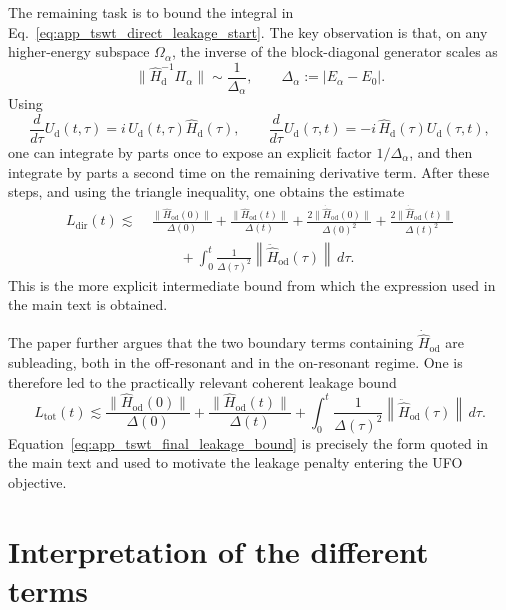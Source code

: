The remaining task is to bound the integral in Eq.~\eqref{eq:app_tswt_direct_leakage_start}. The key observation is that, on any higher-energy subspace \(\Omega_\alpha\), the inverse of the block-diagonal generator scales as
\begin{equation}
\|\hat{H}_{\mathrm d}^{-1}\Pi_\alpha\|
\sim
\frac{1}{\Delta_\alpha},
\qquad
\Delta_\alpha:=|E_\alpha-E_0|.
\label{eq:app_tswt_inverse_gap_scaling}
\end{equation}
Using
\begin{equation}
\frac{d}{d\tau}U_{\mathrm d}(t,\tau)
=
i\,U_{\mathrm d}(t,\tau)\hat{H}_{\mathrm d}(\tau),
\qquad
\frac{d}{d\tau}U_{\mathrm d}(\tau,t)
=
-i\,\hat{H}_{\mathrm d}(\tau)U_{\mathrm d}(\tau,t),
\label{eq:app_tswt_Ud_derivatives}
\end{equation}
one can integrate by parts once to expose an explicit factor \(1/\Delta_\alpha\), and then integrate by parts a second time on the remaining derivative term. After these steps, and using the triangle inequality, one obtains the estimate
\begin{align}
L_{\mathrm{dir}}(t)
\lesssim\;&
\frac{\|\hat{H}_{\mathrm{od}}(0)\|}{\Delta(0)}
+
\frac{\|\hat{H}_{\mathrm{od}}(t)\|}{\Delta(t)}
+
\frac{2\|\dot{\hat{H}}_{\mathrm{od}}(0)\|}{\Delta(0)^2}
+
\frac{2\|\dot{\hat{H}}_{\mathrm{od}}(t)\|}{\Delta(t)^2}
\nonumber\\
&\qquad
+
\int_0^t
\frac{1}{\Delta(\tau)^2}
\left\|
\ddot{\hat{H}}_{\mathrm{od}}(\tau)
\right\|
\,d\tau .
\label{eq:app_tswt_preliminary_leakage_bound}
\end{align}
This is the more explicit intermediate bound from which the expression used in the main text is obtained.

The paper further argues that the two boundary terms containing \(\dot{\hat H}_{\mathrm{od}}\) are subleading, both in the off-resonant and in the on-resonant regime. One is therefore led to the practically relevant coherent leakage bound
\begin{equation}
L_{\mathrm{tot}}(t)
\lesssim
\frac{\|\hat{H}_{\mathrm{od}}(0)\|}{\Delta(0)}
+
\frac{\|\hat{H}_{\mathrm{od}}(t)\|}{\Delta(t)}
+
\int_0^t
\frac{1}{\Delta(\tau)^2}
\left\|
\ddot{\hat{H}}_{\mathrm{od}}(\tau)
\right\|
\,d\tau .
\label{eq:app_tswt_final_leakage_bound}
\end{equation}
Equation~\eqref{eq:app_tswt_final_leakage_bound} is precisely the form quoted in the main text and used to motivate the leakage penalty entering the UFO objective.

\section{Interpretation of the different terms}
\label{app:tswt_bound_interpretation}

